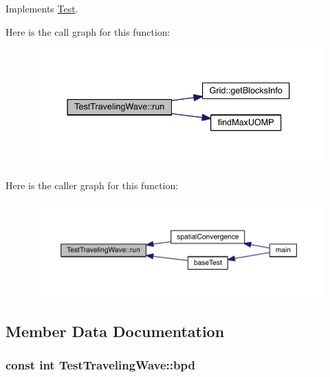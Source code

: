 Implements \hyperlink{class_test_a7e98fbe7ebf3acede5ee3fed91de3c6a}{Test}.



Here is the call graph for this function\+:\nopagebreak
\begin{figure}[H]
\begin{center}
\leavevmode
\includegraphics[width=337pt]{d1/d0e/class_test_traveling_wave_a877227aae97a436f3ac05b5f0d4cd704_cgraph}
\end{center}
\end{figure}




Here is the caller graph for this function\+:\nopagebreak
\begin{figure}[H]
\begin{center}
\leavevmode
\includegraphics[width=350pt]{d1/d0e/class_test_traveling_wave_a877227aae97a436f3ac05b5f0d4cd704_icgraph}
\end{center}
\end{figure}




\subsection{Member Data Documentation}
\hypertarget{class_test_traveling_wave_a311622713a88eb93558ca2fe900f715d}{}
\subsubsection[{bpd}]{\setlength{\rightskip}{0pt plus 5cm}const int Test\+Traveling\+Wave\+::bpd\hspace{0.3cm}{\ttfamily [protected]}}\label{class_test_traveling_wave_a311622713a88eb93558ca2fe900f715d}
\hypertarget{class_test_traveling_wave_a24374140412009702060be76ae0a0fd8}{}
